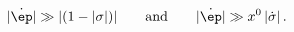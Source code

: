 \begin{equation}
 |\dot{\ep}|\gg |(1-|\sigma|)|\qquad\mbox{and}\qquad
	|\dot{\ep}|\gg x^0\,|\dot{\sigma}|\,.
\label{epsilon}
\end{equation}

